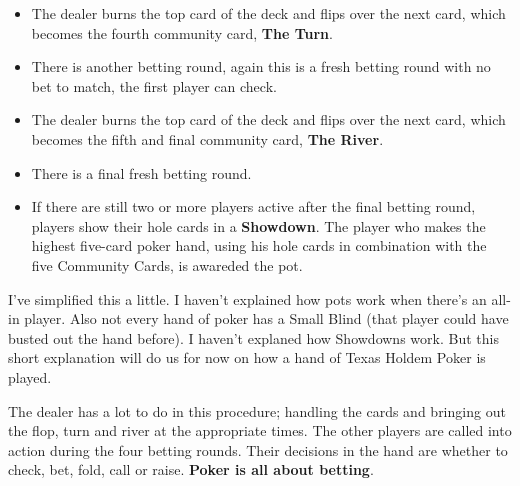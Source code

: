 \begin{itemize}
\item The dealer burns the top card of the deck and flips over the
  next card, which becomes the fourth community card, \textbf{The
    Turn}.

\item There is another betting round, again this is a fresh betting
  round with no bet to match, the first player can check.

\item The dealer burns the top card of the deck and flips over the
  next card, which becomes the fifth and final community card, \textbf{The
    River}.

\item There is a final fresh betting round.

\item If there are still two or more players active after the final
  betting round, players show their hole cards in a \textbf{Showdown}.
  The player who makes the highest five-card poker hand, using his
  hole cards in combination with the five Community Cards, is awareded
  the pot.

\end{itemize}

I've simplified this a little. I haven't explained how pots work when
there's an all-in player. Also not every hand of poker has a Small Blind
(that player could have busted out the hand before). I haven't
explaned how Showdowns work. But this short explanation will do us for
now on how a hand of Texas Holdem Poker is played.

The dealer has a lot to do in this procedure; handling the cards and
bringing out the flop, turn and river at the appropriate times. The
other players are called into action during the four betting
rounds. Their decisions in the hand are whether to check, bet, fold,
call or raise. \textbf{Poker is all about betting}.
